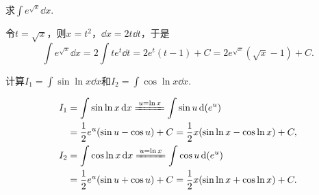 \begin{example}
求\(\int e^{\sqrt{x}} \dd{x}\).
\begin{solution}
令\(t = \sqrt{x}\)，则\(x = t^2\)，\(\dd{x} = 2t\dd{t}\)，于是\[
\int e^{\sqrt{x}} \dd{x}
= 2 \int t e^t \dd{t}
= 2 e^t (t-1) + C
= 2 e^{\sqrt{x}} (\sqrt{x}-1) + C.
\]
\end{solution}
\end{example}

\begin{example}
计算\(I_1 = \int \sin{\ln{x}} \dd{x}\)和\(I_2 = \int \cos{\ln{x}} \dd{x}\).
\begin{solution}
\begin{align*}
I_1
&= \int \sin{\ln x}\dd{x}
\xlongequal{u = \ln x} \int \sin u \dd(e^u) \\
&= \frac{1}{2} e^u (\sin u - \cos u) + C
= \frac{1}{2} x (\sin{\ln x} - \cos{\ln x}) + C, \\
I_2
&= \int \cos{\ln x}\dd{x}
\xlongequal{u = \ln x} \int \cos u \dd(e^u) \\
&= \frac{1}{2} e^u (\sin u + \cos u) + C
= \frac{1}{2} x (\sin{\ln x} + \cos{\ln x}) + C.
\end{align*}
\end{solution}
\end{example}

